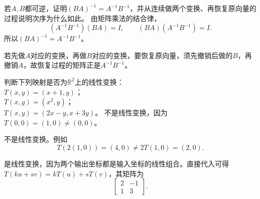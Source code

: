 若\(A , B\)都可逆，证明\(\left( B A \right)^{- 1} = A^{- 1} B^{- 1}\)，并从连续做两个变换、再恢复原向量的过程说明次序为什么如此。
\solutionanswer
由矩阵乘法的结合律，
\[
(A^{-1}B^{-1})(BA)=I,\qquad
(BA)(A^{-1}B^{-1})=I.
\]
所以\((BA)^{-1}=A^{-1}B^{-1}\)。

若先做\(A\)对应的变换，再做\(B\)对应的变换，要恢复原向量，须先撤销后做的\(B\)，再撤销\(A\)，故恢复过程的矩阵正是\(A^{-1}B^{-1}\)。


判断下列映射是否为\(\mathbb{R}^{2}\)上的线性变换：\\
\(T \left( x , y \right) = \left( x + 1 , y \right)\)；\\
\(T \left( x , y \right) = \left( x^{2} , y \right)\)；\\
\(T \left( x , y \right) = \left( 2 x - y , x + 3 y \right)\)。
\solutionanswer
{}不是线性变换，因为\(T(0,0)=(1,0)\ne(0,0)\)。

不是线性变换。例如
\[
T(2(1,0))=(4,0)\ne2T(1,0)=(2,0).
\]

是线性变换，因为两个输出坐标都是输入坐标的线性组合。直接代入可得\(T(ku+sv)=kT(u)+sT(v)\)，其矩阵为
\[
\begin{bmatrix}2&-1\\1&3\end{bmatrix}.
\]


